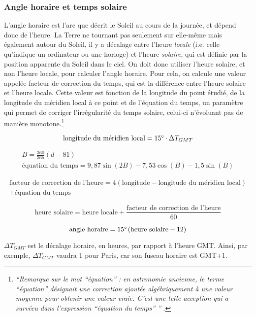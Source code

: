 \documentclass[12pt]{article}
\begin{document}
\subsubsection{Angle horaire et temps solaire} %

L'angle horaire est l'arc que décrit le Soleil au cours de la journée, et dépend donc de l'heure.
La Terre ne tournant pas seulement sur elle-même mais également autour du Soleil, il y a décalage entre l'heure \emph{locale} (i.e. celle qu'indique un ordinateur ou une horloge) et l'heure \emph{solaire}, qui est définie par la position apparente du Soleil dans le ciel.
On doit donc utiliser l'heure solaire, et non l'heure locale, pour calculer l'angle horaire.
Pour cela, on calcule une valeur appelée facteur de correction du temps, qui est la différence entre l'heure solaire et l'heure locale.
Cette valeur est fonction de la longitude du point étudié, de la longitude du méridien local à ce point et de l'équation du temps, un paramètre qui permet de corriger l'irrégularité du temps solaire, celui-ci n'évoluant pas de manière monotone.\footnote{\textit{``Remarque sur le mot ``équation'' : en astronomie ancienne, le terme ``équation'' désignait une correction ajoutée algébriquement à une valeur moyenne pour obtenir une valeur vraie.
C'est une telle acception qui a survécu dans l'expression ``équation du temps'' ''} \cite{equation_temps_wiki}.}

\[
	\text{longitude du méridien local} = 15 \degree \cdot \Delta T_{GMT}
\]

\begin{gather*}
	B = \frac{360}{365} \left( d - 81 \right) \\
	\text{équation du temps} = 9,87 \sin \left( 2B \right) - 7,53 \cos \left( B \right) - 1,5 \sin \left( B \right)
\end{gather*}

\begin{multline*}
	\text{facteur de correction de l'heure} = 4 \left( \text{longitude} - \text{longitude du méridien local} \right) \\ + \text{équation du temps}
\end{multline*}

\[
	\text{heure solaire} = \text{heure locale} + \frac{\text{facteur de correction de l'heure}}{60}
\]

\[
	\text{angle horaire} = 15 \degree \left(
		\text{heure solaire} - 12
	\right)
\]

$\Delta T_{GMT}$ est le décalage horaire, en heures, par rapport à l'heure GMT. Ainsi, par exemple, $\Delta T_{GMT}$ vaudra $1$ pour Paris, car son fuseau horaire est GMT+1.
\end{document}
